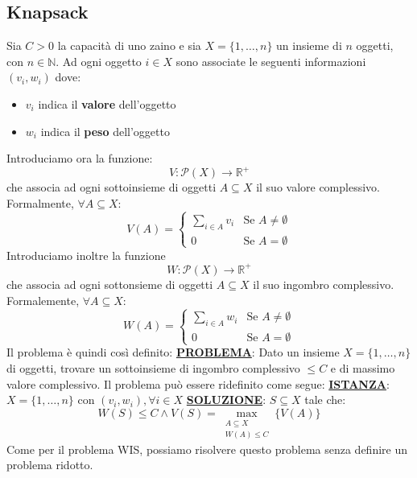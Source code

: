 \documentclass[12pt]{article}
\begin{document}
\subsection{Knapsack}
Sia $C > 0$ la capacità di uno zaino e sia $X = \{1, \dots, n\}$ un insieme di $n$ oggetti, con $n \in \mathbb{N}$.
Ad ogni oggetto $i \in X$ sono associate le seguenti informazioni $(v_i, w_i)$ dove:
\begin{itemize}
    \item $v_i$ indica il \textbf{valore} dell'oggetto
    \item $w_i$ indica il \textbf{peso} dell'oggetto
\end{itemize}
Introduciamo ora la funzione:
$$V: \mathcal{P}(X) \rightarrow \mathbb{R}^+$$
che associa ad ogni sottoinsieme di oggetti $A \subseteq X$ il suo valore complessivo. Formalmente, $\forall A \subseteq X$:
\begin{equation*}
    V(A) = \begin{cases}
        \sum_{i \in A} v_i & \textrm{Se } A \neq \emptyset \\
        0 & \textrm{Se } A = \emptyset
    \end{cases}
\end{equation*}
Introduciamo inoltre la funzione
$$W: \mathcal{P}(X) \rightarrow \mathbb{R}^+$$
che associa ad ogni sottonsieme di oggetti $A \subseteq X$ il suo ingombro complessivo. Formalemente, $\forall A \subseteq X$:
\begin{equation*}
    W(A) = \begin{cases}
        \sum_{i \in A} w_i & \textrm{Se } A \neq \emptyset \\
        0 & \textrm{Se } A = \emptyset
    \end{cases}
\end{equation*}
Il problema è quindi così definito: \newline
\textbf{\underline{PROBLEMA}}: Dato un insieme $X = \{1,\dots, n\}$ di oggetti, trovare un sottoinsieme di ingombro complessivo $\leq C$ e di massimo valore complessivo. \newline
Il problema può essere ridefinito come segue: \newline
\textbf{\underline{ISTANZA}}: $X = \{1,\dots, n\}$ con $(v_i, w_i), \forall i \in X$ \newline
\textbf{\underline{SOLUZIONE}}: $S \subseteq X$ tale che:
$$W(S) \leq C \land V(S) = \max_{\substack{A \subseteq X \\ W(A) \leq C}} \{V(A)\}$$
Come per il problema WIS, possiamo risolvere questo problema senza definire un problema ridotto.
\end{document}
